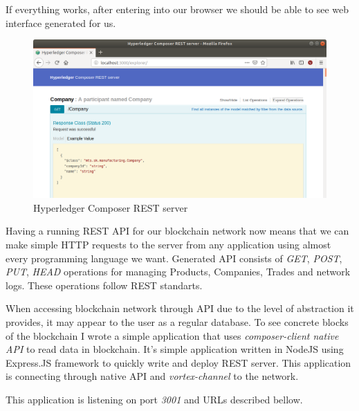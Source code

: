 If everything works, after entering  into our browser we should be able to see web interface generated for us.

\begin{figure}[H]
    \begin{center}
        \begin{minipage}{\linewidth}
            \begin{center}
                \includegraphics[width=(\textwidth),keepaspectratio]{img/composer_server.png}
                \caption{Hyperledger Composer REST server}
                \label{obr 1.2.1}
            \end{center}
        \end{minipage}
    \end{center}
\end{figure}

Having a running REST API for our blockchain network now means that we can make simple HTTP requests to the server from any application using almost every programming language we want. Generated API consists of  \emph{GET}, \emph{POST}, \emph{PUT}, \emph{HEAD} operations for managing Products, Companies, Trades and network logs. These operations follow REST standarts. 
                
When accessing blockchain network through API due to the level of abstraction it provides, it may appear to the user as a regular database. To see concrete blocks of the blockchain I wrote a simple application that uses \emph{composer-client native API} to read data in blockchain. It's simple application written in NodeJS using Express.JS framework to quickly write and deploy REST server. This application is connecting through native API and \emph{vortex-channel} to the network. 

This application is listening on port \emph{3001} and URLs described bellow.


